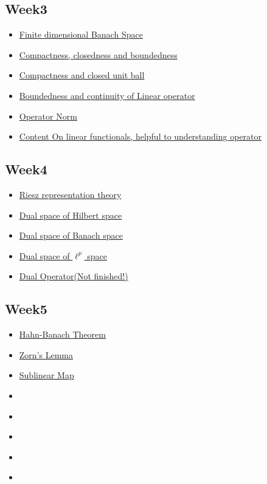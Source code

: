 \subsection{Week3}
\begin{itemize}
	\item \hyperref[finite dimensional Banach]{Finite dimensional Banach Space}

	\item \hyperref[compactness]{Compactness, closedness and boundedness}
	\item \hyperref[compact unit balls]{Compactness and closed unit ball}
	\item \hyperref[continuity of LO]{Boundedness and continuity of Linear operator}
	\item \hyperref[operator norm]{Operator Norm}
	\item \hyperref[Linear Functionals]{\color{red}Content On linear functionals, helpful to understanding operator}
\end{itemize}

\subsection{Week4}
\begin{itemize}
	\item \hyperref[Riesz representation theory]{Riesz representation theory}
	\item \hyperref[dual space Hilbert]{Dual space of Hilbert space}
	\item \hyperref[dual space Banach]{Dual space of Banach space}
	\item \hyperref[lp dual]{Dual space of $\ell^p$ space}
	\item \hyperref[dual operator]{Dual Operator(Not finished!)}
\end{itemize}





\subsection{Week5}
\begin{itemize}
	\item \hyperref[Hahn-Banach Theorem]{Hahn-Banach Theorem}
	\item \hyperref[Zorn's Lemma]{Zorn's Lemma}
	\item \hyperref[sublinear map]{Sublinear Map}
	\item \hyperref[separations]{\placeholder}
	\item \hyperref[]{}
	\item \hyperref[]{}
	\item \hyperref[]{}
	\item \hyperref[]{}
\end{itemize}

